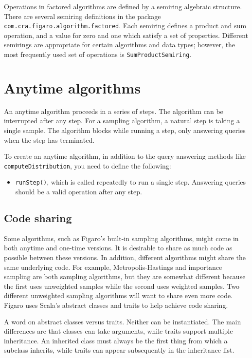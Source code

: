 Operations in factored algorithms are defined by a semiring algebraic structure. There are several semiring definitions in the package \texttt{com.cra.figaro.algorithm.factored}. Each semiring defines a product and sum operation, and a value for zero and one which satisfy a set of properties. Different semirings are appropriate for certain algorithms and data types; however, the most frequently used set of operations is \texttt{SumProductSemiring}.

\section{Anytime algorithms}

An anytime algorithm proceeds in a series of steps. The algorithm can be interrupted after any step. For a sampling algorithm, a natural step is taking a single sample. The algorithm blocks while running a step, only answering queries when the step has terminated.

To create an anytime algorithm, in addition to the query answering methods like
\texttt{computeDistribution}, you need to define the following:

\begin{itemize}
\item \texttt{runStep()}, which is called repeatedly to run a single step. Answering queries should be a valid operation after any step.
\end{itemize}

\subsection{Code sharing}

Some algorithms, such as Figaro's built-in sampling algorithms, might come in both anytime and one-time versions. It is desirable to share as much code as possible between these versions. In addition, different algorithms might share the same underlying code. For example, Metropolis-Hastings and importance sampling are both sampling algorithms, but they are somewhat different because the first uses unweighted samples while the second uses weighted samples. Two different unweighted sampling algorithms will want to share even more code. Figaro uses Scala's abstract classes and traits to help achieve code sharing.

A word on abstract classes versus traits. Neither can be instantiated. The main differences are that classes can take arguments, while traits support multiple inheritance. An inherited class must always be the first thing from which a subclass inherits, while traits can appear subsequently in the inheritance list.

